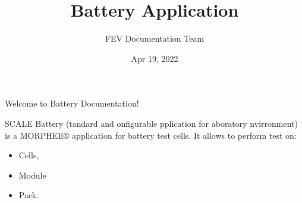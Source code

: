 \documentclass[letterpaper,10pt,english]{jupyterBook}
\title{Battery Application}
\date{Apr 19, 2022}
\author{FEV Documentation Team}
\begin{document}
\pagestyle{empty}
\sphinxmaketitle
\pagestyle{plain}
\sphinxtableofcontents
\pagestyle{normal}
\label{\detokenize{index::doc}}


\sphinxAtStartPar
Welcome to  Battery Documentation!
\begin{quote}

\sphinxAtStartPar
{}
\end{quote}

\sphinxAtStartPar
SCALE Battery (tandard and onfigurable pplication for aboratory nvirronment) is a MORPHEE® application for battery test cells. It allows to perform test on:
\begin{itemize}
\item {} 
\sphinxAtStartPar
Cells,

\item {} 
\sphinxAtStartPar
Module

\item {} 
\sphinxAtStartPar
Pack.

\end{itemize}
\end{document}
